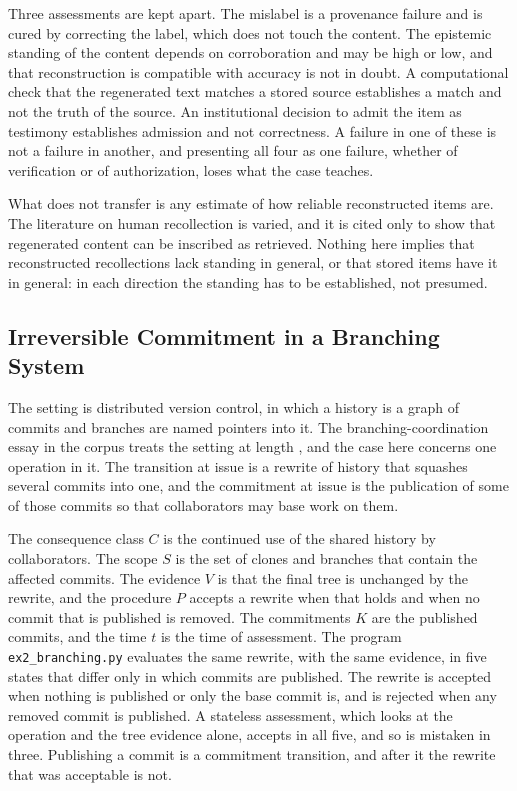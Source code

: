 Three assessments are kept apart. The mislabel is a provenance failure and is cured by correcting the label, which does not touch the content. The epistemic standing of the content depends on corroboration and may be high or low, and that reconstruction is compatible with accuracy is not in doubt. A computational check that the regenerated text matches a stored source establishes a match and not the truth of the source. An institutional decision to admit the item as testimony establishes admission and not correctness. A failure in one of these is not a failure in another, and presenting all four as one failure, whether of verification or of authorization, loses what the case teaches.

What does not transfer is any estimate of how reliable reconstructed items are. The literature on human recollection is varied, and it is cited only to show that regenerated content can be inscribed as retrieved. Nothing here implies that reconstructed recollections lack standing in general, or that stored items have it in general: in each direction the standing has to be established, not presumed.

\subsection{Irreversible Commitment in a Branching System}

The setting is distributed version control, in which a history is a graph of commits and branches are named pointers into it. The branching-coordination essay in the corpus treats the setting at length \cite{echo}, and the case here concerns one operation in it. The transition at issue is a rewrite of history that squashes several commits into one, and the commitment at issue is the publication of some of those commits so that collaborators may base work on them.

The consequence class $C$ is the continued use of the shared history by collaborators. The scope $S$ is the set of clones and branches that contain the affected commits. The evidence $V$ is that the final tree is unchanged by the rewrite, and the procedure $P$ accepts a rewrite when that holds and when no commit that is published is removed. The commitments $K$ are the published commits, and the time $t$ is the time of assessment. The program \texttt{ex2\_branching.py} evaluates the same rewrite, with the same evidence, in five states that differ only in which commits are published. The rewrite is accepted when nothing is published or only the base commit is, and is rejected when any removed commit is published. A stateless assessment, which looks at the operation and the tree evidence alone, accepts in all five, and so is mistaken in three. Publishing a commit is a commitment transition, and after it the rewrite that was acceptable is not.

